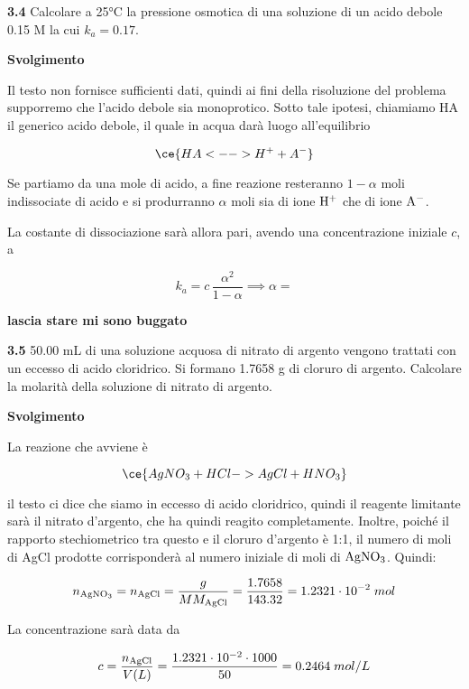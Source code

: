 \vspace{0.2cm}\textbf{3.4} Calcolare a 25°C la pressione osmotica di una soluzione di un acido debole 0.15 M la cui $k_a=0.17$.

\vspace{0.2cm}\large\textbf{Svolgimento}\normalsize

\vspace{0.2cm}Il testo non fornisce sufficienti dati, quindi ai fini della risoluzione del problema supporremo che l'acido debole sia monoprotico. Sotto tale ipotesi, chiamiamo HA il generico acido debole, il quale in acqua darà luogo all'equilibrio

$$\ce{HA <--> H^+ + A^-}$$

Se partiamo da una mole di acido, a fine reazione resteranno $1 - \alpha$ moli indissociate di acido e si produrranno $\alpha$ moli sia di ione $\rm H^+$ che di ione $\rm A^-$. 

La costante di dissociazione sarà allora pari, avendo una concentrazione iniziale $c$, a

$$k_a=c\,\frac{\alpha^2}{1-\alpha}
\implies
\alpha=$$

\textbf{lascia stare mi sono buggato}

\vspace{0.2cm}\textbf{3.5} 50.00 mL di una soluzione acquosa di nitrato di argento vengono trattati con un eccesso di acido
cloridrico. Si formano 1.7658 g di cloruro di argento. Calcolare la molarità della soluzione di nitrato
di argento.

\vspace{0.2cm}\large\textbf{Svolgimento}\normalsize

\vspace{0.2cm}La reazione che avviene è

$$\ce{AgNO_3 + HCl -> AgCl + HNO_3}$$

il testo ci dice che siamo in eccesso di acido cloridrico, quindi il reagente limitante sarà il nitrato d'argento, che ha quindi reagito completamente. Inoltre, poiché il rapporto stechiometrico tra questo e il cloruro d'argento è 1:1, il numero di moli di AgCl prodotte corrisponderà al numero iniziale di moli di $\rm AgNO_3$. Quindi:

$$n_{\rm AgNO_3}=n_{\rm AgCl}=\frac{g}{MM_{\rm AgCl}}
=\frac{1.7658}{143.32}=1.2321 \cdot 10^{-2}\;mol$$

La concentrazione sarà data da

$$c=\frac{n_{\rm AgCl}}{V(L)}
=\frac{1.2321 \cdot 10^{-2} \cdot 1000}{50}
=0.2464\;mol/L$$

